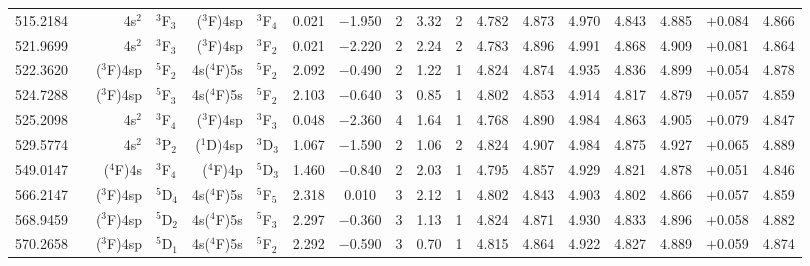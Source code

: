 \documentclass[traditabstract]{aa}
\newcommand{\ph}{\phantom{$-$}}
\newcommand{\pst}{\phantom{*}}
\begin{document}
\begin{center}
\begin{mpsupertabular}{r@{}c@{\ \ \ }r@{~}l@{\ }r@{~}l@{\ \ \ }c@{\ \ \ }c@{\ \ \ }c@{\ \ \ }c@{\ \ \ }c@{\ \ \ }c@{\ \ \ }c@{\ \ \ }c@{\ \ \ }c@{\ \ \ }c@{\ \ \ }r@{\ \ \ }c}
515.2184 & & \footnotesize 4s$^2$    &\footnotesize$^3$F$_3$             &\footnotesize($^3$F)4sp &\footnotesize$^3$F$_4$             & 0.021 & $-$1.950 & 2  & 3.32 & 2\pst      & 4.782 & 4.873 & 4.970 & 4.843 & 4.885 & $+$0.084    & 4.866 \\
521.9699 & & \footnotesize 4s$^2$    &\footnotesize$^3$F$_3$             &\footnotesize($^3$F)4sp &\footnotesize$^3$F$_2$             & 0.021 & $-$2.220 & 2  & 2.24 & 2\pst      & 4.783 & 4.896 & 4.991 & 4.868 & 4.909 & $+$0.081    & 4.864 \\
522.3620 & & \footnotesize ($^3$F)4sp&\footnotesize$^5$F$_2$             &\footnotesize4s($^4$F)5s&\footnotesize$^5$F$_2$             & 2.092 & $-$0.490 & 2  & 1.22 & 1\pst      & 4.824 & 4.874 & 4.935 & 4.836 & 4.899 & $+$0.054    & 4.878 \\
524.7288 & & \footnotesize ($^3$F)4sp&\footnotesize$^5$F$_3$             &\footnotesize4s($^4$F)5s&\footnotesize$^5$F$_2$             & 2.103 & $-$0.640 & 3  & 0.85 & 1\pst      & 4.802 & 4.853 & 4.914 & 4.817 & 4.879 & $+$0.057    & 4.859 \\
525.2098 & & \footnotesize 4s$^2$    &\footnotesize$^3$F$_4$             &\footnotesize($^3$F)4sp &\footnotesize$^3$F$_3$             & 0.048 & $-$2.360 & 4  & 1.64 & 1\pst      & 4.768 & 4.890 & 4.984 & 4.863 & 4.905 & $+$0.079    & 4.847 \\
529.5774 & & \footnotesize 4s$^2$    &\footnotesize$^3$P$_2$             &\footnotesize($^1$D)4sp &\footnotesize$^3$D$_3$             & 1.067 & $-$1.590 & 2  & 1.06 & 2\pst      & 4.824 & 4.907 & 4.984 & 4.875 & 4.927 & $+$0.065    & 4.889 \\
549.0147 & & \footnotesize ($^4$F)4s &\footnotesize$^3$F$_4$             &\footnotesize($^4$F)4p  &\footnotesize$^5$D$_3$             & 1.460 & $-$0.840 & 2  & 2.03 & 1\pst      & 4.795 & 4.857 & 4.929 & 4.821 & 4.878 & $+$0.051    & 4.846 \\
566.2147 & & \footnotesize ($^3$F)4sp&\footnotesize$^5$D$_4$             &\footnotesize4s($^4$F)5s&\footnotesize$^5$F$_5$             & 2.318 & \ph0.010 & 3  & 2.12 & 1\pst      & 4.802 & 4.843 & 4.903 & 4.802 & 4.866 & $+$0.057    & 4.859 \\
568.9459 & & \footnotesize ($^3$F)4sp&\footnotesize$^5$D$_2$             &\footnotesize4s($^4$F)5s&\footnotesize$^5$F$_3$             & 2.297 & $-$0.360 & 3  & 1.13 & 1\pst      & 4.824 & 4.871 & 4.930 & 4.833 & 4.896 & $+$0.058    & 4.882 \\
570.2658 & & \footnotesize ($^3$F)4sp&\footnotesize$^5$D$_1$             &\footnotesize4s($^4$F)5s&\footnotesize$^5$F$_2$             & 2.292 & $-$0.590 & 3  & 0.70 & 1\pst      & 4.815 & 4.864 & 4.922 & 4.827 & 4.889 & $+$0.059    & 4.874 \\

\end{mpsupertabular}
\end{center}
\end{document}
